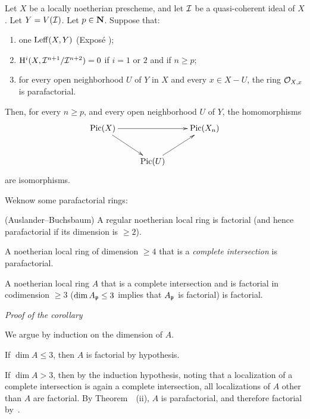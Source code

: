 \begin{proposition} \label{XI.3.12}
Let $X$ be a locally noetherian prescheme, and let $\mathcal I$ be a quasi-coherent ideal of $X$. Let $Y=V(\mathcal I)$. Let $p\in\mathbf N$. Suppose that:
\begin{enumerate}
\item[1)] one  $\operatorname{Leff}(X, Y)$ (\textup{Expos\'e} );
\item[2)] $\mathrm H^i(X, \mathcal I^{n+1}/\mathcal I^{n+2})=0$ if $i=1$ or $2$ and if $n\geq p$;
\item[3)] for every open neighborhood $U$ of $Y$ in $X$ and every $x\in X-U$, the ring $\mathcal O_{X,x}$ is parafactorial.
\end{enumerate}
\noindent
Then, for every $n\geq p$, and every open neighborhood $U$ of $Y$, the homomorphisms
\[
\xymatrix{\Pic(X)\ar[rr]\ar[dr]&&\Pic(X_n)\\&\Pic(U)\ar[ur]&}
\]
are isomorphisms.
\end{proposition}

We\pageoriginale know some parafactorial rings:

\skpt
\begin{theoreme} \label{XI.3.13}
\begin{enumeratei}
\item
(Auslander--Buchsbaum) A regular noetherian local ring is factorial (and hence parafactorial if its dimension is $\geq 2$).
\item
A noetherian local ring of dimension $\geq 4$ that is a \emph{complete intersection} is parafactorial.
\end{enumeratei}
\end{theoreme}

\begin{corollaire} A noetherian local ring $A$ that is a complete intersection and is factorial in codimension $\geq 3$ (\ie $\dim A_{{\mathfrak{p}}}\leq 3$ implies that $A_{{\mathfrak{p}}}$ is factorial) is factorial.
\end{corollaire}

\emph{Proof of the corollary}

We argue by induction on the dimension of $A$.

If $\dim A\leq 3$, then $A$ is factorial by hypothesis.

If $\dim A>3$, then by the induction hypothesis, noting that a localization of a complete intersection is again a complete intersection, all localizations of $A$ other than $A$ are factorial. By Theorem~~(ii), $A$ is parafactorial, and therefore factorial by~.


